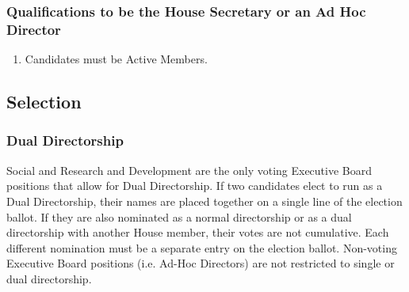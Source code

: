 \documentclass{article}
\newcommand{\asection}[1]{\subsection{#1} \label{#1}}
\newcommand{\asubsection}[1]{\subsubsection{#1} \label{#1}}
\begin{document}
\asubsection{Qualifications to be the House Secretary or an Ad Hoc Director}
\begin{enumerate}
\item
 Candidates must be Active Members.
\end{enumerate}

\asection{Selection}
\asubsection{Dual Directorship}
Social and Research and Development are the only voting Executive Board positions that allow for Dual Directorship. If two candidates elect to run as a Dual Directorship, their names are placed together on a single line of the election ballot. If they are also nominated as a normal directorship or as a dual directorship with another House member, their votes are not cumulative. Each different nomination must be a separate entry on the election ballot. 
Non-voting Executive Board positions (i.e. Ad-Hoc Directors) are not restricted to single or dual directorship.
\end{document}
